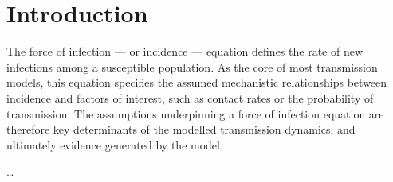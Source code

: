 \section{Introduction}\label{intro}
The force of infection --- or incidence --- equation defines
the rate of new infections among a susceptible population.
As the core of most transmission models, this equation specifies
the assumed mechanistic relationships between incidence and factors of interest,
such as contact rates or the probability of transmission.
The assumptions underpinning a force of infection equation
are therefore key determinants of the modelled transmission dynamics,
and ultimately evidence generated by the model.
\par
\nocite{Rao2021,Johnson2016a}
\dots
